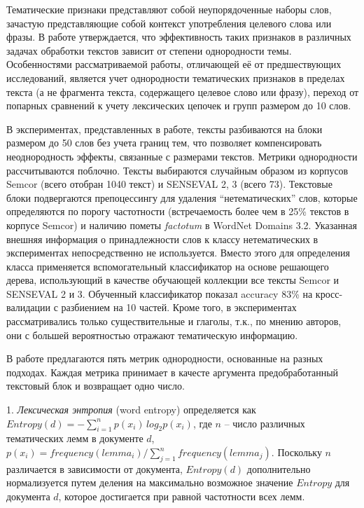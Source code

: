 Тематические признаки представляют собой неупорядоченные наборы слов, зачастую представляющие собой контекст употребления целевого слова или фразы. В работе утверждается, что эффективность таких признаков в различных задачах обработки текстов зависит от степени однородности темы. Особенностями рассматриваемой работы, отличающей её от предшествующих исследований, является учет однородности тематических признаков в пределах текста (а не фрагмента текста, содержащего целевое слово или фразу), переход от попарных сравнений к учету лексических цепочек и групп размером до 10 слов.

В экспериментах, представленных в работе, тексты разбиваются на блоки размером до 50 слов без учета границ тем, что позволяет компенсировать неоднородность эффекты, связанные с размерами текстов. Метрики однородности рассчитываются поблочно. Тексты выбираются случайным образом из корпусов Semcor (всего отобран 1040 текст) и SENSEVAL 2, 3 (всего 73). Текстовые блоки подвергаются препоцессингу для удаления ``нетематических'' слов, которые определяются по порогу частотности (встречаемость более чем в 25\% текстов в корпусе Semcor) и наличию пометы \textit{factotum} в WordNet Domains 3.2. Указанная внешняя информация о принадлежности слов к классу нетематических в экспериментах непосредственно не используется. Вместо этого для определения класса применяется вспомогательный классификатор на основе решающего дерева, использующий в качестве обучающей коллекции все тексты Semcor и SENSEVAL 2 и 3. Обученный классификатор показал accuracy 83\% на кросс-валидации с разбиением на 10 частей. Кроме того, в экспериментах рассматривались только существительные и глаголы, т.к., по мнению авторов, они с большей вероятностью отражают тематическую информацию.

В работе предлагаются пять метрик однородности, основанные на разных подходах. Каждая метрика принимает в качесте аргумента предобработанный текстовый блок и возвращает одно число.

1. \textit{Лексическая энтропия} (word entropy) определяется как $Entropy(d) = -\sum_{i = 1}^{n}p(x_i)\,log_2 p(x_i)$, где $n$ -- число различных тематических лемм в документе $d$, $p(x_i) = frequency(lemma_i) / \sum_{j=1}^{n} frequency(lemma_j)$. Поскольку $n$ различается в зависимости от документа, $Entropy(d)$ дополнительно нормализуется путем деления на максимально возможное значение $Entropy$ для документа $d$, которое достигается при равной частотности всех лемм.


